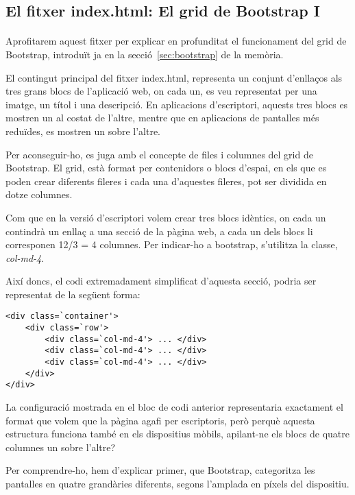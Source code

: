 \subsection{El fitxer index.html: El grid de Bootstrap I}\label{sec:bootstrap1}

    \paragraph{}
    Aprofitarem aquest fitxer per explicar en profunditat el funcionament del grid de Bootstrap, introduït ja en la secció~\ref{sec:bootstrap} de la memòria.

    El contingut principal del fitxer index.html, representa un conjunt d'enllaços als tres grans blocs de l'aplicació web, on cada un, es veu representat per una imatge, un títol i una descripció. En aplicacions d'escriptori, aquests tres blocs es mostren un al costat de l'altre, mentre que en aplicacions de pantalles més reduïdes, es mostren un sobre l'altre.

    Per aconseguir-ho, es juga amb el concepte de files i columnes del grid de Boots\-trap. El grid, està format per contenidors o blocs d'espai, en els que es poden crear diferents fileres i cada una d'aquestes fileres, pot ser dividida en dotze columnes.

    Com que en la versió d'escriptori volem crear tres blocs idèntics, on cada un contindrà un enllaç a una secció de la pàgina web, a cada un dels blocs li corresponen 12/3 = 4 columnes. Per indicar-ho a bootstrap, s'utilitza la classe, \emph{col-md-4}.

    Així doncs, el codi extremadament simplificat d'aquesta secció, podria ser representat de la següent forma:

    \begin{lstlisting}[style=rawOwn,caption={Exemple bàsic de divisió d'una filera en tres columnes}]
<div class=`container'>
    <div class=`row'>
        <div class=`col-md-4'> ... </div>
        <div class=`col-md-4'> ... </div>
        <div class=`col-md-4'> ... </div>
	</div>
</div>
    \end{lstlisting}

    La configuració mostrada en el bloc de codi anterior representaria exactament el format que volem que la pàgina agafi per escriptoris, però perquè aquesta estructura funciona també en els dispositius mòbils, apilant-ne els blocs de quatre columnes un sobre l'altre?

    Per comprendre-ho, hem d'explicar primer, que Bootstrap, categoritza les pantalles en quatre grandàries diferents, segons l'amplada en píxels del dispositiu.

